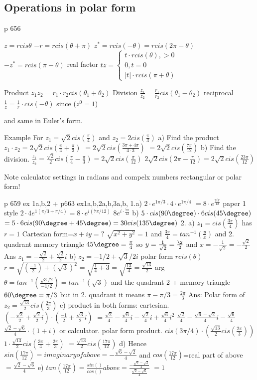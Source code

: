 \subsection{Operations in polar form}
p 656

$z=r cis \theta$
$-r=r cis(\theta + \pi)$
$z^*=r cis(-\theta)=rcis(2\pi-\theta)$
$-z^*=r cis(\pi-\theta)$
real factor $t z=\begin{cases}t\cdot r cis(\theta),>0
\\ 0, t=0\\
|t|\cdot r cis(\pi+\theta)\end{cases}$

Product $z_1z_2=r_1\cdot r_2 cis(\theta_1+\theta_2)$
Division $\frac{z_1}{z_2}=\frac{r_1}{r_2}cis(\theta_1-\theta_2)$
reciprocal $\frac{1}{z}=\frac{1}{r}\cdot cis(-\theta)$ since ($z^0=1$)

and same in Euler's form.

Example For $z_1=\sqrt{2}cis(\frac{\pi}{4})$ and $z_2=2cis(\frac{\pi}{3})$
a) Find the product
$z_1\cdot z_2=2\sqrt{2}cis(\frac{\pi}{4}+\frac{\pi}{3})$
$=2\sqrt{2}cis(\frac{3\pi+4\pi}{4\cdot3})$
$=2\sqrt{2}cis(\frac{7\pi}{12})$
b) Find the division.
$\frac{z_1}{z_2}=\frac{\sqrt{2}}{2}cis(\frac{\pi}{4}-\frac{\pi}{3})=2\sqrt{2} cis(\frac{\pi}{12})$
$2\sqrt{2} cis(2\pi-\frac{\pi}{12})=2\sqrt{2}cis(\frac{23\pi}{12})$

Note calculator settings in radians and compelx numbers rectangular or polar form!

p 659 ex 1a,b,2 + p663 ex1a,b,2a,b,3a,b,
1.a) $2\cdot e^{1\pi/3}\cdot 4\cdot e^{1\pi/4}$
$=8\cdot e^{\frac{7i\pi}{12}}$
paper 1 style $2\cdot 4 e^{1(\pi/3+\pi/4)}=8\cdot e^{i(7\pi/12)}$
$8e^{i\cdot\frac{7\pi}{12}}$
b) $5\cdot cis(90\degree)\cdot 6cis(45\degree)$
$=5\cdot 6cis(90\degree+45\degree)=30cis(135\degree)$
2. a) $z_1=cis(\frac{3\pi}{4})$
has $r=1$
Cartesian form=$x+iy=?$
$\sqrt{x^2+y^2}=1$ and $\frac{3\pi}{4}=tan^{-1}(\frac{y}{x})$ and 2. quadrant
memory triangle $45\degree=\frac{\pi}{4}$
so $y=\frac{1}{\sqrt{2}}=\frac{\2}{2}$ and $x=-\frac{1}{\sqrt{2}}=-\frac{\sqrt{2}}{2}$
Ans $z_1=-\frac{\sqrt{2}}{2}+\frac{\sqrt{2}}{2}i$
b) $z_2=-1/2+\sqrt{3}/2i$
polar form $r cis(\theta)$
$r=\sqrt{(\frac{-1}{2})+(\sqrt{3})^2}=\sqrt{\frac{1}{4}+3}=\sqrt{\frac{13}{4}}=\frac{\sqrt{13}}{2}$
arg$\theta=tan^{-1}(\frac{\sqrt{3}/2}{-1/2})=tan^{-1}(\sqrt{3})$ and the quadrant 2 + memory triangle $60\degree=\pi/3$
but in 2. quadrant it means $\pi-\pi/3=\frac{2\pi}{3}$
Ans: Polar form of $z_2=\frac{\sqrt{13}}{2}cis(\frac{2\pi}{3})$
c) product in both forms:
cartesian.
$(-\frac{\sqrt{2}}{2}+\frac{\sqrt{2}}{2}i)\cdot(\frac{-1}{2}+\frac{\sqrt{3}}{2}i)$
$=\frac{\sqrt{2}}{4}-\frac{\sqrt{6}}{4}i-\frac{\sqrt{2}}{4}i+\frac{\sqrt{6}}{4}i^2$
$\frac{\sqrt{2}}{4}-\frac{\sqrt{6}-\sqrt{2}}{4}i-\frac{\sqrt{6}}{4}$
$\frac{\sqrt{2}-\sqrt{6}}{4}\cdot(1+i)$ or calculator.
polar form product.
$cis(3\pi/4)\cdot(\frac{\sqrt{13}}{2}cis(\frac{2\pi}{3}))$
$1\cdot\frac{\sqrt{13}}{2}cis(\frac{3\pi}{4}+\frac{2\pi}{3})$
$=\frac{\sqrt{13}}{2}cis(\frac{17\pi}{12})$
d) Hence $sin(\frac{17\pi}{12})=imaginary of above=-\frac{\sqrt{6}-\sqrt{2}}{4}$
and $cos(\frac{17\pi}{12})$=real part of above$=\frac{\sqrt{2}-\sqrt{6}}{4}$
e) $tan(\frac{17\pi}{12})=\frac{sin()}{cos()} above=\frac{-\frac{\sqrt{6}-\sqrt{2}}{4}}{\frac{\sqrt{2}-\sqrt{6}}{4}}$
$=1$

